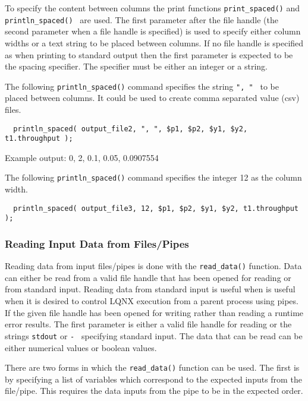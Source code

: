 To specify the content between columns the print functions {\tt print\_spaced()} and {\tt println\_spaced() }
are used. The first parameter after the file handle (the second parameter when a file handle is specified) is 
used to specify either column widths or a text string to be placed between columns. If no file handle is specified
as when printing to standard output then the first parameter is expected to be the spacing specifier. The specifier
must be either an integer or a string.

The following {\tt println\_spaced()} command specifies the string {\tt ", " } to be placed between columns. It could be used
to create comma separated value (csv) files.

\lstset{language=LQX}
\begin{lstlisting}
  println_spaced( output_file2, ", ", $p1, $p2, $y1, $y2, t1.throughput );
\end{lstlisting}

Example output: 0, 2, 0.1, 0.05, 0.0907554

The following {\tt println\_spaced()} command specifies the integer 12 as the column width.

\lstset{language=LQX}
\begin{lstlisting}
  println_spaced( output_file3, 12, $p1, $p2, $y1, $y2, t1.throughput );
\end{lstlisting}

\subsubsection{Reading Input Data from Files/Pipes}

Reading data from input files/pipes is done with the {\tt read\_data()} function. Data can either be read from a valid
file handle that has been opened for reading or from standard input. Reading data from standard input is useful when
is useful when it is desired to control LQNX execution from a parent process using pipes.
If the given file handle has been opened for writing rather than reading a runtime error results. The first 
parameter is either a valid file handle for reading or the strings {\tt stdout} or {\tt - } specifying 
standard input. The data that can be read can be either numerical values or boolean values.

There are two forms in which the {\tt read\_data()} function can be used. The first is by specifying a list of
\ModLang variables which correspond to the expected inputs from the file/pipe. This requires the data inputs
from the pipe to be in the expected order.

